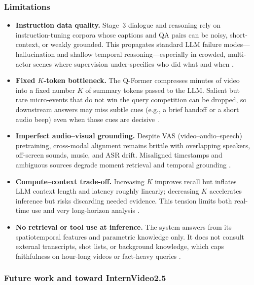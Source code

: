 \begin{enrichment}
\begin{enrichment}
        \subsubsection{Limitations}
        \begin{itemize}
            \item \textbf{Instruction data quality.} Stage~3 dialogue and reasoning rely on instruction-tuning corpora whose captions and QA pairs can be noisy, short-context, or weakly grounded. This propagates standard LLM failure modes---hallucination and shallow temporal reasoning---especially in crowded, multi-actor scenes where supervision under-specifies who did what and when \cite{wang2024_internvideo2}.
            \item \textbf{Fixed $K$-token bottleneck.} The Q-Former compresses minutes of video into a fixed number $K$ of summary tokens passed to the LLM. Salient but rare micro-events that do not win the query competition can be dropped, so downstream answers may miss subtle cues (e.g., a brief handoff or a short audio beep) even when those cues are decisive \cite{wang2024_internvideo2}.
            \item \textbf{Imperfect audio--visual grounding.} Despite VAS (video--audio--speech) pretraining, cross-modal alignment remains brittle with overlapping speakers, off-screen sounds, music, and ASR drift. Misaligned timestamps and ambiguous sources degrade moment retrieval and temporal grounding \cite{wang2024_internvideo2}.
            \item \textbf{Compute--context trade-off.} Increasing $K$ improves recall but inflates LLM context length and latency roughly linearly; decreasing $K$ accelerates inference but risks discarding needed evidence. This tension limits both real-time use and very long-horizon analysis \cite{wang2024_internvideo2}.
            \item \textbf{No retrieval or tool use at inference.} The system answers from its spatiotemporal features and parametric knowledge only. It does not consult external transcripts, shot lists, or background knowledge, which caps faithfulness on hour-long videos or fact-heavy queries \cite{wang2024_internvideo2}.
        \end{itemize}
        
        \subsubsection{Future work and toward InternVideo2.5}
        

\end{enrichment}
\end{enrichment}
